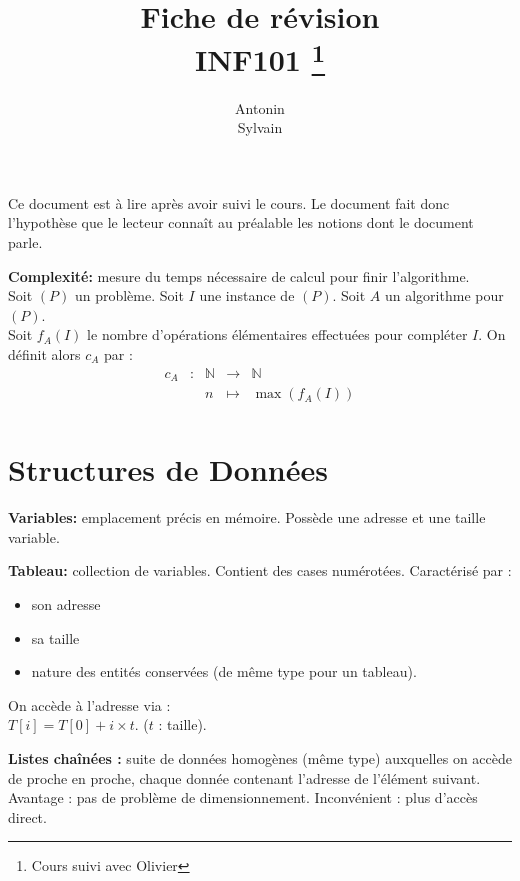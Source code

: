 \documentclass[a4paper, 8pt]{article}
\title{\sffamily\textbf{Fiche de révision \\ INF101} \thanks{Cours suivi avec Olivier \bsc{Hudry} }}
\author{Antonin \bsc{Godard}\\Sylvain \bsc{Rager}}
\date{}
\begin{document}
\begin{multicols*}{3}
\setlength{\parindent}{0pt}
\maketitle

\begin{changemargin}{0.5cm}{0.5cm} 
{\footnotesize Ce document est à lire après avoir suivi le cours. Le document fait donc l'hypothèse que le lecteur connaît au préalable les notions dont le document parle.}
\end{changemargin}


\textbf{Complexité:} mesure du temps nécessaire de calcul pour finir l'algorithme.\\ Soit $(P)$ un problème. Soit $I$ une instance de $(P)$. Soit $A$ un algorithme pour $(P)$.\\ Soit $f_A(I)$ le nombre d'opérations élémentaires effectuées pour compléter $I$. On définit alors $c_A$ par :
\[
\begin{array}{cc|ccl}
c_A & : & \mathbb{N} & \to & \mathbb{N} \\
 & & n & \mapsto & \max(f_A(I)) \\
\end{array}
\]

\section*{Structures de Données}

\textbf{Variables:} emplacement précis en mémoire. Possède une adresse et une taille variable.

\textbf{Tableau:} collection de variables. Contient des cases numérotées. Caractérisé par :\begin{itemize}
\item son adresse
\item sa taille
\item nature des entités conservées (de même type pour un tableau).
\end{itemize}
On accède à l'adresse via :\\ $ T\left[ i\right] = T\left[ 0\right] + i\times t $. ($t$ : taille).

\textbf{Listes chaînées :} suite de données homogènes (même type) auxquelles on accède de proche en proche, chaque donnée contenant l'adresse de l'élément suivant. Avantage : pas de problème de dimensionnement. Inconvénient : plus d'accès direct.


\end{multicols*}
\end{document}
